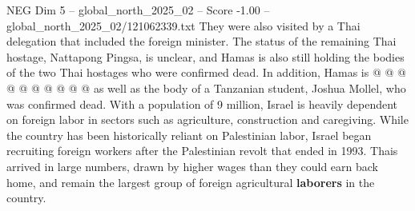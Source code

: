 \begin{textsample}{NEG Dim 5 – global\_north\_2025\_02 – Score -1.00 – global\_north\_2025\_02/121062339.txt}
They were also visited by a Thai delegation that included the foreign minister.
The status of the remaining Thai hostage, Nattapong Pingsa, is unclear, and Hamas is also still holding the bodies of the two Thai hostages who were confirmed dead.
In addition, Hamas is @ @ @ @ @ @ @ @ @ @ as well as the body of a Tanzanian student, Joshua Mollel, who was confirmed dead.
With a population of 9 million, Israel is heavily dependent on foreign labor in sectors such as agriculture, construction and caregiving.
While the country has been historically reliant on Palestinian labor, Israel began recruiting foreign workers after the Palestinian revolt that ended in 1993.
Thais arrived in large numbers, drawn by higher wages than they could earn back home, and remain the largest group of foreign agricultural \textbf{laborers} in the country.

\end{textsample}
